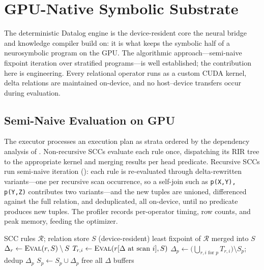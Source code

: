 \section{GPU-Native Symbolic Substrate}\label{sec:datalog}

The deterministic Datalog engine is the device-resident core the neural bridge and knowledge compiler build on: it is what keeps the symbolic half of a neurosymbolic program on the GPU. The algorithmic approach---semi-naive fixpoint iteration over stratified programs---is well established; the contribution here is engineering. Every relational operator runs as a custom CUDA kernel, delta relations are maintained on-device, and no host--device transfers occur during evaluation.

\subsection{Semi-Naive Evaluation on GPU}

The executor processes an execution plan as strata ordered by the dependency analysis of . Non-recursive SCCs evaluate each rule once, dispatching its RIR tree to the appropriate kernel and merging results per head predicate. Recursive SCCs run semi-naive iteration (): each rule is re-evaluated through delta-rewritten variants---one per recursive scan occurrence, so a self-join such as \texttt{p(X,Y), p(Y,Z)} contributes two variants---and the new tuples are unioned, differenced against the full relation, and deduplicated, all on-device, until no predicate produces new tuples. The profiler records per-operator timing, row counts, and peak memory, feeding the optimizer.

\begin{algorithm}[htbp]
\caption{GPU semi-naive evaluation of a recursive SCC. All buffers are device-resident.}
\label{alg:seminaive}
\begin{algorithmic}[1]
\Require SCC rules $\mathcal{R}$; relation store $S$ (device-resident)
\Ensure least fixpoint of $\mathcal{R}$ merged into $S$
  \State $\Delta_r \gets \textsc{Eval}(r, S) \setminus S$ 
\EndFor
\Repeat
    \State $T_{r,i} \gets \textsc{Eval}(r[\Delta \text{ at scan } i], S)$ 
  \EndFor
    \State $\Delta_p \gets \big(\textstyle\bigcup_{r,i \text{ for } p} T_{r,i}\big) \setminus S_p$; \quad dedup $\Delta_p$
    \State $S_p \gets S_p \cup \Delta_p$ 
  \EndFor
{}
\State free all $\Delta$ buffers
\end{algorithmic}
\end{algorithm}

